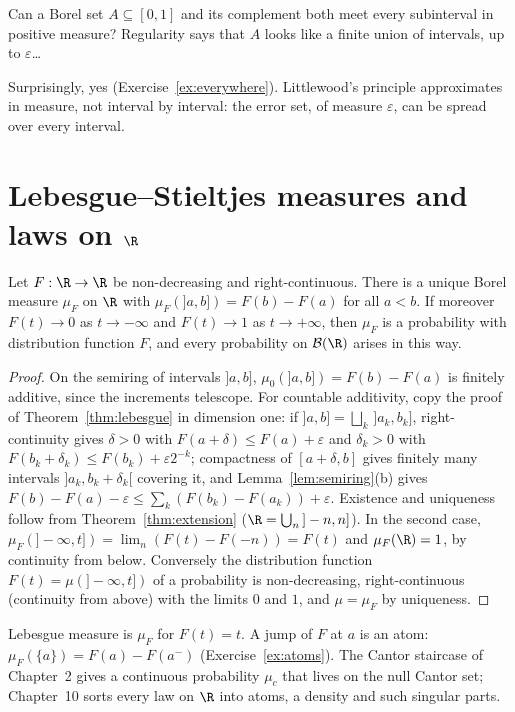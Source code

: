 \begin{think}
Can a Borel set $A\subseteq[0,1]$ and its complement both meet every subinterval in positive measure? Regularity says that $A$ looks like a finite union of
intervals, up to $\varepsilon$\dots
\end{think}

Surprisingly, yes (Exercise~\ref{ex:everywhere}). Littlewood's principle approximates in measure, not interval by interval: the error set, of measure
$\varepsilon$, can be spread over every interval.

\section{Lebesgue--Stieltjes measures and laws on \texorpdfstring{$\R$}{R}}

\begin{theorem}\label{thm:stieltjes}
Let $F:\R\to\R$ be non-decreasing and right-continuous. There is a unique Borel measure $\mu_F$ on $\R$ with $\mu_F(]a,b])=F(b)-F(a)$ for all $a<b$. If moreover $F(t)\to0$ as
$t\to-\infty$ and $F(t)\to1$ as $t\to+\infty$, then $\mu_F$ is a probability with distribution function $F$, and every probability on $\mathcal B(\R)$ arises in this way.
\end{theorem}
\begin{proof}
On the semiring of intervals $]a,b]$, $\mu_0(]a,b])=F(b)-F(a)$ is finitely additive, since the increments telescope. For countable additivity, copy the proof of
Theorem~\ref{thm:lebesgue} in dimension one: if $]a,b]=\bigsqcup_k\,]a_k,b_k]$, right-continuity gives $\delta>0$ with $F(a+\delta)\le F(a)+\varepsilon$ and $\delta_k>0$ with $F(b_k+\delta_k)\le F(b_k)+\varepsilon2^{-k}$;
compactness of $[a+\delta,b]$ gives finitely many intervals $]a_k,b_k+\delta_k[$ covering it, and Lemma~\ref{lem:semiring}(b) gives $F(b)-F(a)-\varepsilon\le\sum_k(F(b_k)-F(a_k))+\varepsilon$. Existence and uniqueness
follow from Theorem~\ref{thm:extension} ($\R=\bigcup_n\,]-n,n]$). In the second case, $\mu_F(]-\infty,t])=\lim_n(F(t)-F(-n))=F(t)$ and $\mu_F(\R)=1$, by continuity from below. Conversely the
distribution function $F(t)=\mu(]-\infty,t])$ of a probability is non-decreasing, right-continuous (continuity from above) with the limits $0$ and $1$, and $\mu=\mu_F$ by
uniqueness.
\end{proof}

Lebesgue measure is $\mu_F$ for $F(t)=t$. A jump of $F$ at $a$ is an atom: $\mu_F(\{a\})=F(a)-F(a^-)$ (Exercise~\ref{ex:atoms}). The Cantor staircase of Chapter~2 gives a
continuous probability $\mu_c$ that lives on the null Cantor set; Chapter~10 sorts every law on $\R$ into atoms, a density and such singular parts.

